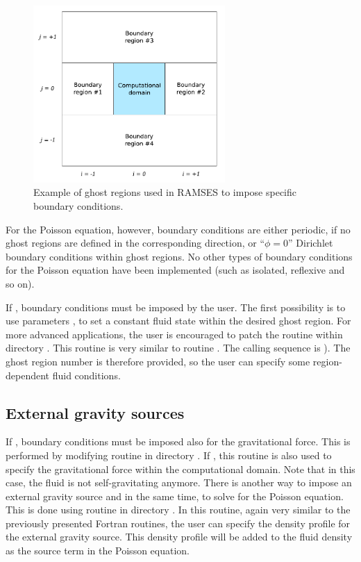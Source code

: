 \begin{figure}
   \begin{center}
   \includegraphics[width=0.65\textwidth]{img/bc.pdf}
   \end{center}
   \caption{Example of ghost regions used in RAMSES to impose specific boundary
conditions.}
   \label{fig:bc}
\end{figure}

For the Poisson equation, however, boundary conditions are either periodic, if
no ghost regions are defined in the corresponding direction, or ``$\phi=0$''
Dirichlet boundary conditions within ghost regions. No other types of boundary
conditions for the Poisson equation have been implemented (such as isolated,
reflexive and so on).

If , boundary conditions must be imposed by the
user. The first possibility is to use parameters ,
 to set a constant fluid state within the desired
ghost region. For more advanced applications, the user is encouraged to patch
the routine  within directory . This routine is
very similar to routine . The calling sequence is ). The ghost region number is therefore provided,
so the user can specify some region-dependent fluid conditions.

\subsection{External gravity sources}

If , boundary conditions must be imposed also for
the gravitational force. This is performed by modifying routine
 in directory . If , this
routine is also used to specify the gravitational force within the
computational domain. Note that in this case, the fluid is not self-gravitating
anymore. There is another way to impose an external gravity source and in the
same time, to solve for the Poisson equation. This is done using routine
 in directory . In this routine, again very
similar to the previously presented Fortran routines, the user can specify the
density profile for the external gravity source.  This density profile will be
added to the fluid density as the source term in the Poisson equation.

